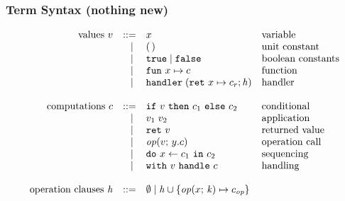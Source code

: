 \documentclass[usenames,dvipsnames]{beamer}
\begin{document}
\begin{frame}
  \frametitle{Term Syntax (nothing new)}
  
\[
	\begin{array}{rrll}
		\text{values}~v
		 & ::=   & x                                                                              & \text{variable}          \\
		 & \vsep & \unit                                                                          & \text{unit constant}     \\
		 & \vsep & \true \vsep \false                                                             & \text{boolean constants} \\
		 & \vsep & \fun{x}{c}                                                                     & \text{function}          \\
		 & \vsep & \handler{\hcases}                                                              & \text{handler}           \\
		 \\
		 \text{computations}~c
		 & ::=   & \ifclause{v}{c_1}{c_2}                                                         & \text{conditional}       \\
		 & \vsep & \apply{v_1}{v_2}                                                               & \text{application}       \\
		 & \vsep & \return{v}                                                                     & \text{returned value}    \\
		 & \vsep & \operation{v}{y.c}                                                             & \text{operation call}    \\
		 & \vsep & \dobind{x}{c_1}{c_2}                                                           & \text{sequencing}        \\
		 & \vsep & \withhandle{v}{c}                                                              & \text{handling}					\\
		 \\
		 \text{operation clauses}~\hcases
		  & ::=   & \emptyhcases \vsep \hcases \union \set{\operation{x}{\contin} \mapsto c_{\op}}                            \\
		\end{array}
		\]
\end{frame}
\end{document}
